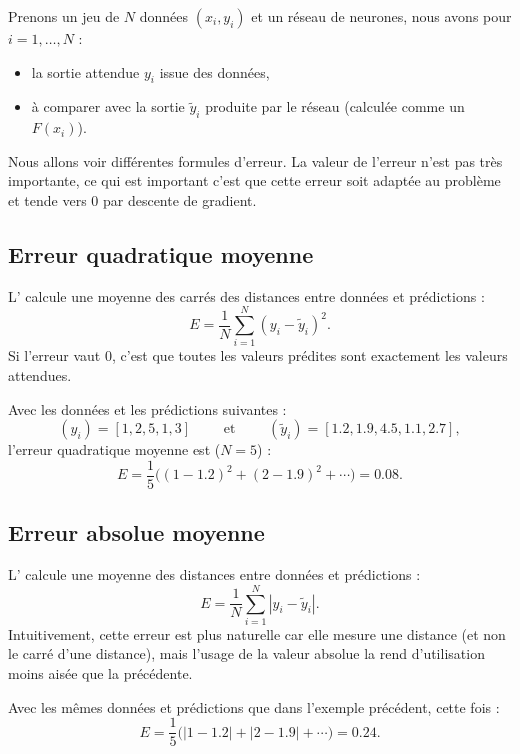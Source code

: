 \documentclass[11pt,class=report,crop=false]{standalone}
\begin{document}

Prenons un jeu de $N$ données $(x_i,y_i)$ et un réseau de neurones, nous avons pour $i=1,\ldots,N$ :
\begin{itemize}
  \item la sortie attendue $y_i$ issue des données,
  \item à comparer avec la sortie $\widetilde y_i$ produite par le réseau (calculée comme un $F(x_i)$). 
\end{itemize}

Nous allons voir différentes formules d'erreur. La valeur de l'erreur n'est pas très importante, ce qui est important c'est que cette erreur soit adaptée au problème et tende vers $0$ par descente de gradient.

\subsection{Erreur quadratique moyenne}

L' calcule une moyenne des carrés des distances entre données et prédictions :
$$E = \frac{1}{N} \sum_{i=1}^N (y_i-\widetilde y_i)^2.$$
Si l'erreur vaut $0$, c'est que toutes les valeurs prédites sont exactement les valeurs attendues.
  
\begin{exemple}
Avec les données et les prédictions suivantes : 
$$(y_i) =  [1, 2, 5, 1, 3]
\qquad \text{ et } \qquad
(\widetilde y_i) = [1.2, 1.9, 4.5, 1.1, 2.7],
$$
l'erreur quadratique moyenne est ($N=5$) : 
$$E = \frac{1}{5} \big( (1-1.2)^2+ (2-1.9)^2 + \cdots \big) = 0.08.$$
\end{exemple}

  
\subsection{Erreur absolue moyenne}

L' calcule une moyenne des distances entre données et prédictions :
$$E = \frac{1}{N} \sum_{i=1}^N |y_i-\widetilde y_i|.$$
Intuitivement, cette erreur est plus naturelle car elle mesure une distance (et non le carré d'une distance), mais l'usage de la valeur absolue la rend d'utilisation moins aisée que la précédente.
  
\begin{exemple}
Avec les mêmes données et prédictions que dans l'exemple précédent, cette fois :
$$E = \frac{1}{5} \big( |1-1.2|+ |2-1.9| + \cdots \big) = 0.24.$$
\end{exemple}
  
\end{document}
